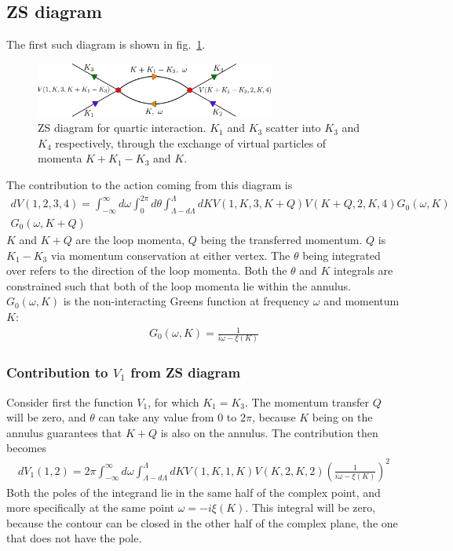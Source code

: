 \documentclass[14pt]{extarticle}
\begin{document}
\subsection{ZS diagram}
The first such diagram is shown in fig.~\ref{loop11}.
\begin{figure}[!htpb]
	\centering
\includegraphics[width=0.7\textwidth]{./figures/term3.pdf}
\caption{ZS diagram for quartic interaction. \(K_1\) and \(K_3\) scatter into \(K_3\) and \(K_4\) respectively, through the exchange of virtual particles of momenta \(K + K_1 - K_3\) and \(K\).}
\label{loop11}
\end{figure}
The contribution to the action coming from this diagram is
\begin{equation}\begin{aligned}
	dV(1,2,3,4) = \int_{-\infty}^\infty d\omega  \int_0^{2\pi} d\theta \int_{\Lambda - d\Lambda}^\Lambda dK V(1,K,3,K+Q) V(K+Q, 2, K, 4) G_0(\omega, K)\\
	G_0(\omega, K+Q)
\end{aligned}\end{equation}
\(K\) and \(K+Q\) are the loop momenta, \(Q\) being the transferred momentum. \(Q\) is \(K_1 - K_3\) via momentum conservation at either vertex. The \(\theta\) being integrated over refers to the direction of the loop momenta. Both the \(\theta\) and \(K\) integrals are constrained such that both of the loop momenta lie within the annulus. \(G_0(\omega,K)\) is the non-interacting Greens function at frequency \(\omega\) and momentum \(K\):
\begin{equation}\begin{aligned}
	G_0(\omega,K) = \frac{1}{i\omega - \xi(K)}
\end{aligned}\end{equation}
\subsubsection{Contribution to \(V_1\) from ZS diagram}
Consider first the function \(V_1\), for which \(K_1=K_3\). The momentum transfer \(Q\) will be zero, and \(\theta\) can take any value from \(0\) to \(2\pi\), because \(K\) being on the annulus guarantees that \(K+Q\) is also on the annulus. The contribution then becomes
\begin{equation}\begin{aligned}
	dV_1(1,2) = 2\pi \int_{-\infty}^\infty d\omega \int_{\Lambda - d\Lambda}^\Lambda dK V(1,K,1,K) V(K, 2, K, 2) \left(\frac{1}{i\omega - \xi(K)}\right)^2
\end{aligned}\end{equation}
Both the poles of the integrand lie in the same half of the complex point, and more specifically at the same point \(\omega = -i\xi(K)\). This integral will be zero, because the contour can be closed in the other half of the complex plane, the one that does not have the pole.
\end{document}
